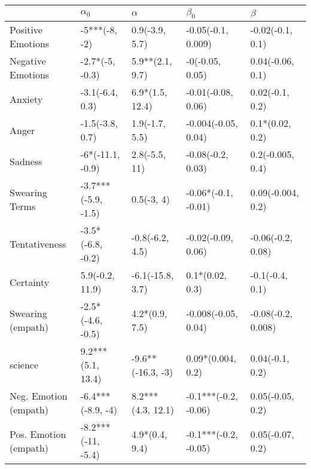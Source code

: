\begin{tabular}{lllll}
\toprule
{} &           $\alpha_0$ &           $\alpha$ &             $\beta_0$ &             $\beta$ \\
\midrule
Positive Emotions     &        -5***(-8, -2) &     0.9(-3.9, 5.7) &    -0.05(-0.1, 0.009) &    -0.02(-0.1, 0.1) \\
Negative Emotions     &      -2.7*(-5, -0.3) &    5.9**(2.1, 9.7) &       -0(-0.05, 0.05) &    0.04(-0.06, 0.1) \\
Anxiety               &      -3.1(-6.4, 0.3) &    6.9*(1.5, 12.4) &    -0.01(-0.08, 0.06) &     0.02(-0.1, 0.2) \\
Anger                 &      -1.5(-3.8, 0.7) &     1.9(-1.7, 5.5) &   -0.004(-0.05, 0.04) &     0.1*(0.02, 0.2) \\
Sadness               &     -6*(-11.1, -0.9) &      2.8(-5.5, 11) &     -0.08(-0.2, 0.03) &    0.2(-0.005, 0.4) \\
Swearing Terms        &  -3.7***(-5.9, -1.5) &         0.5(-3, 4) &   -0.06*(-0.1, -0.01) &   0.09(-0.004, 0.2) \\
Tentativeness         &    -3.5*(-6.8, -0.2) &    -0.8(-6.2, 4.5) &    -0.02(-0.09, 0.06) &   -0.06(-0.2, 0.08) \\
Certainty             &      5.9(-0.2, 11.9) &   -6.1(-15.8, 3.7) &       0.1*(0.02, 0.3) &     -0.1(-0.4, 0.1) \\
Swearing (empath)     &    -2.5*(-4.6, -0.5) &     4.2*(0.9, 7.5) &   -0.008(-0.05, 0.04) &  -0.08(-0.2, 0.008) \\
science               &    9.2***(5.1, 13.4) &  -9.6**(-16.3, -3) &     0.09*(0.004, 0.2) &     0.04(-0.1, 0.2) \\
Neg. Emotion (empath) &    -6.4***(-8.9, -4) &  8.2***(4.3, 12.1) &  -0.1***(-0.2, -0.06) &    0.05(-0.05, 0.2) \\
Pos. Emotion (empath) &   -8.2***(-11, -5.4) &     4.9*(0.4, 9.4) &  -0.1***(-0.2, -0.05) &    0.05(-0.07, 0.2) \\
\bottomrule
\end{tabular}
